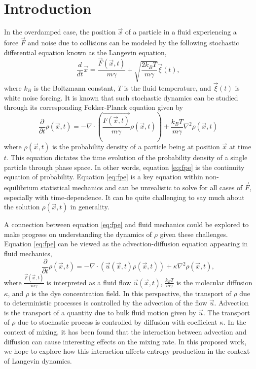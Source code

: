 
\section{Introduction}


 In the overdamped case, the position $\vec{x}$ of a particle in a fluid experiencing a force $\vec{F}$ and noise due to collisions can be modeled by the following stochastic differential equation known as the Langevin equation,
\begin{equation}
\frac{d}{dt} \vec{x} = \frac{\vec{F}(\vec{x},t)}{m\gamma} +\sqrt{\frac{2k_{B}T}{m\gamma}}\vec{\xi}(t),
\label{eq:langevin}
\end{equation}
where $k_{B}$ is the Boltzmann constant, $T$ is the fluid temperature, and $\vec{\xi}(t)$ is white noise forcing. It is known that such stochastic dynamics can be studied through its corresponding Fokker-Planck equation given by 
\begin{equation}
\frac{\partial}{\partial t} \rho (\vec{x},t)  = - \nabla \cdot \left(\frac{\vec{F(\vec{x},t)}}{m\gamma} \rho (\vec{x},t) \right) + \frac{k_{B}T}{m\gamma} \nabla^{2} \rho (\vec{x},t)
\label{eq:fpe}
\end{equation} 
where $\rho(\vec{x},t)$ is the probability density of a particle being at position $\vec{x}$ at time $t$. This equation dictates the time evolution of the probability density of a single particle through phase space. In other words, equation \eqref{eq:fpe} is the continuity equation of probability. Equation \eqref{eq:fpe} is a key equation within non-equilibrium statistical mechanics and can be unrealistic to solve for all cases of $\vec{F}$, especially with time-dependence. It can be quite challenging to say much about the solution $\rho (\vec{x},t)$ in generality.

A connection between equation \eqref{eq:fpe}  and fluid mechanics could be explored to make progress on understanding the dynamics of $\rho$ given these challenges. Equation \eqref{eq:fpe} can be viewed as the advection-diffusion equation appearing in fluid mechanics,
\begin{equation}
\frac{\partial}{\partial t} \rho (\vec{x},t)  = - \nabla \cdot \left(\vec{u} (\vec{x},t)  \rho (\vec{x},t) \right) + \kappa \nabla^{2} \rho (\vec{x},t),
\label{eq:ade}
\end{equation}
where $\frac{\vec{F}(\vec{x},t)}{m\gamma}$ is interpreted as a fluid flow $\vec{u}(\vec{x},t)$, $\frac{k_{B}T}{m\gamma} $ is the molecular diffusion $\kappa$, and $\rho$ is the dye concentration field.
In this perspective, the transport of $\rho$ due to deterministic processes is controlled by the advection of the flow $\vec{u}$. Advection is the transport of a quantity due to bulk fluid motion given by $\vec{u}$. The transport of $\rho$ due to stochastic process is controlled by diffusion with coefficient $\kappa$. In the context of mixing, it has been found that the interaction between advection and diffusion can cause interesting effects on the mixing rate. In this proposed work, we hope to explore how this interaction affects entropy production in the context of Langevin dynamics.

